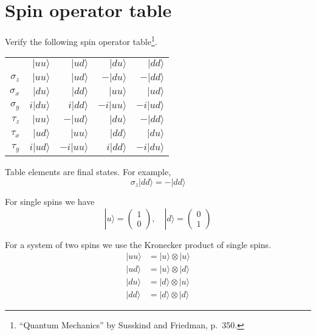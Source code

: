 

\section*{Spin operator table}

Verify the following spin operator table\footnote{``Quantum Mechanics'' by Susskind and Friedman, p.~350.}.

\begin{center}
\begin{tabular}{rrrrr}
& $|uu\rangle$ & $|ud\rangle$ & $|du\rangle$ & $|dd\rangle$
\\[1ex]
$\sigma_z$ & $|uu\rangle$ & $|ud\rangle$ & $-|du\rangle$ & $-|dd\rangle$
\\
$\sigma_x$ & $|du\rangle$ & $|dd\rangle$ & $|uu\rangle$ & $|ud\rangle$
\\
$\sigma_y$ & $i|du\rangle$ & $i|dd\rangle$ & $-i|uu\rangle$ & $-i|ud\rangle$
\\
$\tau_z$ & $|uu\rangle$ & $-|ud\rangle$ & $|du\rangle$ & $-|dd\rangle$
\\
$\tau_x$ & $|ud\rangle$ & $|uu\rangle$ & $|dd\rangle$ & $|du\rangle$
\\
$\tau_y$ & $i|ud\rangle$ & $-i|uu\rangle$ & $i|dd\rangle$ & $-i|du\rangle$
\end{tabular}
\end{center}

Table elements are final states.
For example,
\begin{equation*}
\sigma_z|dd\rangle=-|dd\rangle
\end{equation*}

For single spins we have
\begin{equation*}
|u\rangle=\begin{pmatrix}1\\0\end{pmatrix},
\quad
|d\rangle=\begin{pmatrix}0\\1\end{pmatrix}
\end{equation*}

For a system of two spins we use the Kronecker product of single spins.
\begin{align*}
|uu\rangle&=|u\rangle\otimes|u\rangle
\\
|ud\rangle&=|u\rangle\otimes|d\rangle
\\
|du\rangle&=|d\rangle\otimes|u\rangle
\\
|dd\rangle&=|d\rangle\otimes|d\rangle
\end{align*}


